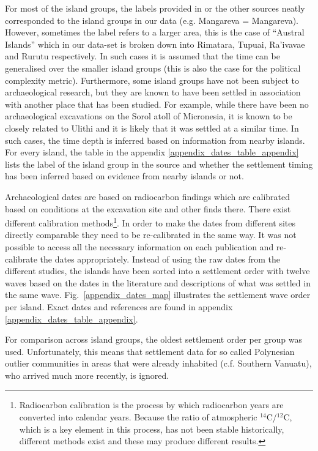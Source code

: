 \documentclass[12pt,letterpaper]{article}
\begin{document}
For most of the island groups, the labels provided in \citet{rieth_cochrane_2018} or the other sources neatly corresponded to the island groups in our data (e.g. Mangareva = Mangareva). However, sometimes the label refers to a larger area, this is the case of ``Austral Islands'' which in our data-set is broken down into Rimatara, Tupuai, Ra'ivavae and Rurutu respectively. In such cases it is assumed that the time can be generalised over the smaller island groups (this is also the case for the political complexity metric). Furthermore, some island groups have not been subject to archaeological research, but they are known to have been settled in association with another place that has been studied. For example, while there have been no archaeological excavations on the Sorol atoll of Micronesia, it is known to be closely related to Ulithi \citep[23]{quackenbush1968sonsorol} and it is likely that it was settled at a similar time. In such cases, the time depth is inferred based on information from nearby islands. For every island, the table in the appendix \ref{appendix_dates_table_appendix} lists the label of the island group in the source and whether the settlement timing has been inferred based on evidence from nearby islands or not.

Archaeological dates are based on radiocarbon findings which are calibrated based on conditions at the excavation site and other finds there. There exist different calibration methods\footnote{Radiocarbon calibration is the process by which radiocarbon years are converted into calendar years. Because the ratio of atmospheric $^{14}$C/$^{12}$C, which is a key element in this process, has not been stable historically, different methods exist and these may produce different results.}. In order to make the dates from different sites directly comparable they need to be re-calibrated in the same way. It was not possible to access all the necessary information on each publication and re-calibrate the dates appropriately. Instead of using the raw dates from the different studies, the islands have been sorted into a settlement order with twelve waves based on the dates in the literature and descriptions of what was settled in the same wave. Fig.~\ref{appendix_dates_map} illustrates the settlement wave order per island. Exact dates and references are found in appendix \ref{appendix_dates_table_appendix}.

For comparison across island groups, the oldest settlement order per group was used. Unfortunately, this means that settlement data for so called Polynesian outlier communities in areas that were already inhabited (c.f. Southern Vanuatu), who arrived much more recently, is ignored.
\end{document}
